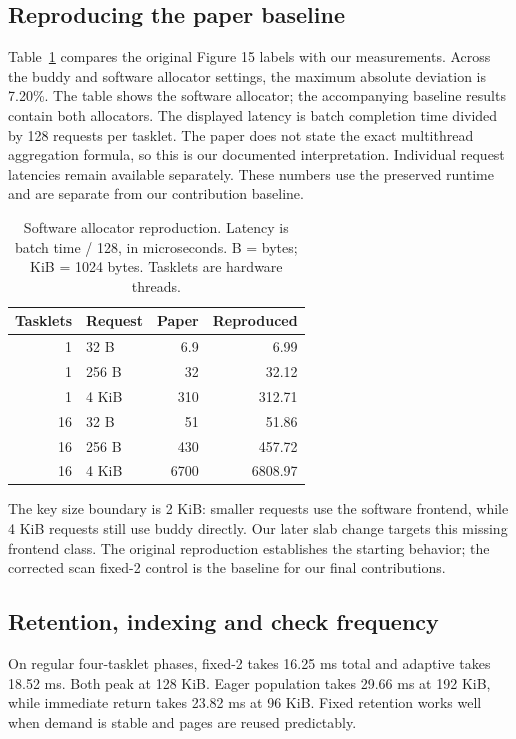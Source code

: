 \documentclass[conference]{IEEEtran}
\begin{document}
\subsection{Reproducing the paper baseline}
Table~\ref{tab:baseline} compares the original Figure 15 labels with our measurements. Across the buddy and software allocator settings, the maximum absolute deviation is 7.20\%. The table shows the software allocator; the accompanying baseline results contain both allocators. The displayed latency is batch completion time divided by 128 requests per tasklet. The paper does not state the exact multithread aggregation formula, so this is our documented interpretation. Individual request latencies remain available separately. These numbers use the preserved runtime and are separate from our contribution baseline.
\begin{table}[t]
\caption{Software allocator reproduction. Latency is batch time / 128, in microseconds. B = bytes; KiB = 1024 bytes. Tasklets are hardware threads.}\label{tab:baseline}
\centering\small
\begin{tabular}{rlrr}\toprule
Tasklets & Request & Paper & Reproduced \\ \midrule
1 & 32 B & 6.9 & 6.99 \\
1 & 256 B & 32 & 32.12 \\
1 & 4 KiB & 310 & 312.71 \\
16 & 32 B & 51 & 51.86 \\
16 & 256 B & 430 & 457.72 \\
16 & 4 KiB & 6700 & 6808.97 \\
\bottomrule\end{tabular}
\end{table}

The key size boundary is 2 KiB: smaller requests use the software frontend, while 4 KiB requests still use buddy directly. Our later slab change targets this missing frontend class. The original reproduction establishes the starting behavior; the corrected scan fixed-2 control is the baseline for our final contributions.

\subsection{Retention, indexing and check frequency}
On regular four-tasklet phases, fixed-2 takes 16.25 ms total and adaptive takes 18.52 ms. Both peak at 128 KiB. Eager population takes 29.66 ms at 192 KiB, while immediate return takes 23.82 ms at 96 KiB. Fixed retention works well when demand is stable and pages are reused predictably.
\end{document}
